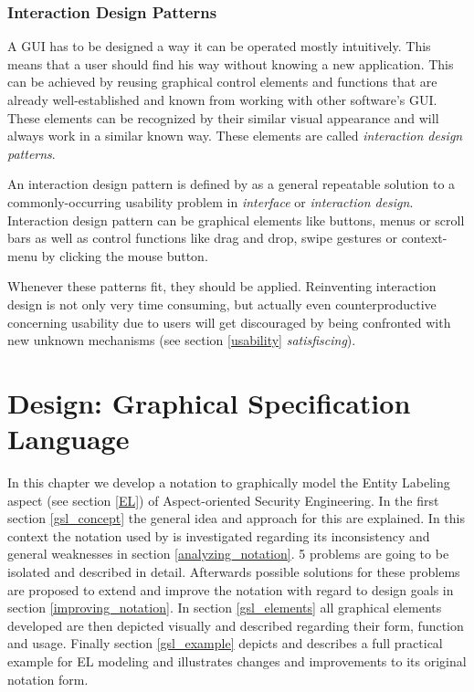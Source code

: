 \documentclass[twoside, openright, 12pt]{book}
\begin{document}
\subsection{Interaction Design Patterns}
\label{design_patterns}
A GUI has to be designed a way it can be operated mostly intuitively.
This means that a user should find his way without knowing a new application.
This can be achieved by reusing graphical control elements and functions that are already well-established and known from working with other software's GUI.
These elements can be recognized by their similar visual appearance and will always work in a similar known way.
These elements are called \textit{interaction design patterns}.

An interaction design pattern is defined by \cite{Folmer} as a general repeatable solution to a commonly-occurring usability problem in \textit{interface} or \textit{interaction design}.
Interaction design pattern can be graphical elements like buttons, menus or scroll bars as well as control functions like drag and drop, swipe gestures or context-menu by clicking the mouse button.

Whenever these patterns fit, they should be applied.
Reinventing interaction design is not only very time consuming, but actually even counterproductive concerning usability due to users will get discouraged by being confronted with new unknown mechanisms (see section \ref{usability} \textit{satisfiscing}).





\cleardoublepage
\chapter{Design: Graphical Specification Language}
\label{gsl}
In this chapter we develop a notation to graphically model the Entity Labeling aspect (see section \ref{EL}) of Aspect-oriented Security Engineering.
In the first section \ref{gsl_concept} the general idea and approach for this are explained.
In this context the notation used by \cite{Amthor18} is investigated regarding its inconsistency and general weaknesses in section \ref{analyzing_notation}.
5 problems are going to be isolated and described in detail.
Afterwards possible solutions for these problems are proposed to extend and improve the notation with regard to design goals in section \ref{improving_notation}.
In section \ref{gsl_elements} all graphical elements developed are then depicted visually and described regarding their form, function and usage.
Finally section \ref{gsl_example} depicts and describes a full practical example for EL modeling and illustrates changes and improvements to its original notation form.
\end{document}
